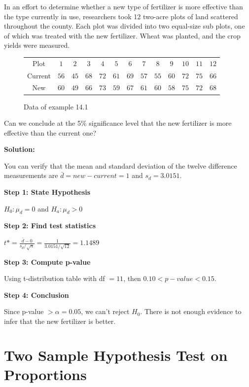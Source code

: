 \begin{example}
In an effort to determine whether a new type of fertilizer is more effective than the type currently in use, researchers took 12 two-acre plots of land scattered throughout the county. Each plot was divided into two equal-size sub plots, one of which was treated with the new fertilizer. Wheat was planted, and the crop yields were measured.

\begin{center}
\begin{figure}[H]
\centering
\begin{tabular}{ c c c c c c c c c c c c c }
Plot & $1$ & $2$ & $3$ & $4$ & $5$ & $6$ & $7$ & $8$ & $9$ & $10$ & $11$ & $12$\\
Current & $56$ & $45$ & $68$ & $72$ & $61$ & $69$ & $57$ & $55$ & $60$ & $72$ & $75$ & $66$\\
New & $60$ & $49$ & $66$ & $73$ & $59$ & $67$ & $61$ & $60$ & $58$ & $75$ & $72$ & $68$\\
\end{tabular}
\caption{Data of example 14.1}
\end{figure}
\end{center}
\vspace{-0.75cm}

Can we conclude at the 5\% signiﬁcance level that the new fertilizer is more eﬀective than the current one?

\textbf{Solution:}

You can verify that the mean and standard deviation of the twelve difference measurements are $\bar{d} = new - current = 1$ and $s_d = 3.0151$.

\textbf{Step 1: State Hypothesis}

$H_0: \mu_d = 0$ and $H_a: \mu_d>0$

\textbf{Step 2: Find test statistics}

$t* = \frac{\bar{d} - 0}{s_d/\sqrt{n}} = \frac{1}{3.0151/\sqrt{12}} = 1.1489$

\textbf{Step 3: Compute p-value}

Using t-distribution table with df $=11$, then $0.10 < p-value < 0.15$.

\textbf{Step 4: Conclusion}

Since p-value $> \alpha = 0.05$, we can’t reject $H_0$. There is not enough evidence to infer that the new fertilizer is better.

\end{example}

\section{Two Sample Hypothesis Test on Proportions}

